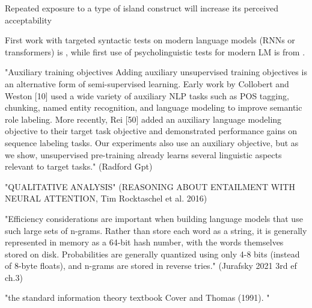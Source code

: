 Repeated exposure to a type of island construct will increase its perceived acceptability 
\citep{chaves2014subject}

First work with targeted syntactic tests on modern language models (RNNs or transformers) is \citet{linzen2016assessing}, while first use of psycholinguistic tests for modern LM is from \citet{futrell2018rnns}.

"Auxiliary training objectives Adding auxiliary unsupervised training objectives is an alternative form of semi-supervised learning. Early work by Collobert and Weston [10] used a wide variety of auxiliary NLP tasks such as POS tagging, chunking, named entity recognition, and language modeling to improve semantic role labeling. More recently, Rei [50] added an auxiliary language modeling objective to their target task objective and demonstrated performance gains on sequence labeling tasks. Our experiments also use an auxiliary objective, but as we show, unsupervised pre-training already learns several linguistic aspects relevant to target tasks." (Radford Gpt)

"QUALITATIVE ANALYSIS" (REASONING ABOUT ENTAILMENT WITH NEURAL ATTENTION, Tim Rocktaschel et al. 2016)

"Efficiency considerations are important when building language models that use
such large sets of n-grams. Rather than store each word as a string, it is generally
represented in memory as a 64-bit hash number, with the words themselves stored
on disk. Probabilities are generally quantized using only 4-8 bits (instead of 8-byte floats), and n-grams are stored in reverse tries." (Jurafsky 2021 3rd ef ch.3)

"the standard information theory textbook Cover and Thomas (1991). "

\nocite{wei2021frequency, hu2020systematic, lau2020furiously, bostrom2020byte, futrell-etal-2019-neural}
